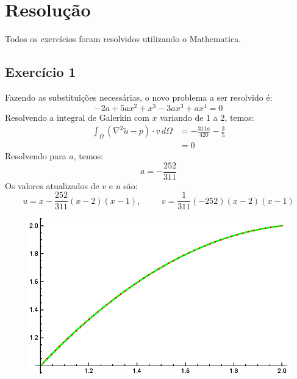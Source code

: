 \documentclass[10pt,a4paper]{article}
\begin{document}
	\section{Resolução}
	Todos os exercícios foram resolvidos utilizando o Mathematica.
	\subsection*{Exercício 1}
	Fazendo as substituições necessárias, o novo problema a ser resolvido é:
	\[-2 a + 5 a x^2 + x^3 - 3 a x^3 + a x^4 = 0\]
	Resolvendo a integral de Galerkin com $x$ variando de 1 a 2, temos:
	\begin{align*}
		\int_\Omega \left(\nabla^2\tilde{u}-p\right)\cdot v\,d\Omega &= -\frac{311 a}{420}-\frac{3}{5}\\
		&= 0
	\end{align*}
	Resolvendo para $a$, temos:
	\[a=-\frac{252}{311}\]
	Os valores atualizados de $v$ e $u$ são:
	\[u = x-\frac{252}{311} (x-2) (x-1), \hspace{1cm} v = \frac{1}{311} (-252) (x-2) (x-1)\]
	
	\begin{figure}[h!]
    \centering
      \includegraphics[scale=1]{figures/exercicio1.eps}
	\end{figure}
	
\end{document}
